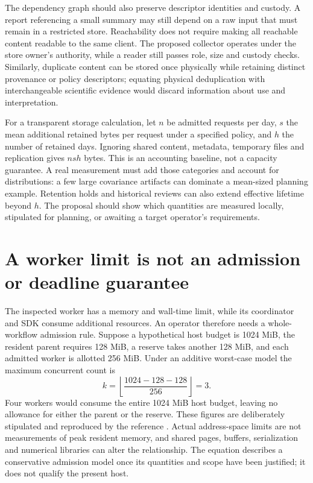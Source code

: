 The dependency graph should also preserve descriptor identities and custody.
A report referencing a small summary may still depend on a raw input that
must remain in a restricted store. Reachability does not require making all
reachable content readable to the same client. The proposed collector
operates under the store owner's authority, while a reader still passes
role, size and custody checks. Similarly, duplicate content can be stored
once physically while retaining distinct provenance or policy descriptors;
equating physical deduplication with interchangeable scientific evidence
would discard information about use and interpretation.

For a transparent storage calculation, let $n$ be admitted requests per day,
$s$ the mean additional retained bytes per request under a specified policy,
and $h$ the number of retained days. Ignoring shared content, metadata,
temporary files and replication gives $nsh$ bytes. This is an accounting
baseline, not a capacity guarantee. A real measurement must add those
categories and account for distributions: a few large covariance artifacts
can dominate a mean-sized planning example. Retention holds and historical
reviews can also extend effective lifetime beyond $h$. The proposal should
show which quantities are measured locally, stipulated for planning, or
awaiting a target operator's requirements.

\section{A worker limit is not an admission or deadline guarantee}
\label{exec17:i4-capacity}

The inspected worker has a memory and wall-time limit, while its coordinator
and SDK consume additional resources. An operator therefore needs a
whole-workflow admission rule. Suppose a hypothetical host budget is
1024 MiB, the resident parent requires 128 MiB, a reserve takes another
128 MiB, and each admitted worker is allotted 256 MiB. Under an additive
worst-case model the maximum concurrent count is
\begin{equation}
 k=\left\lfloor\frac{1024-128-128}{256}\right\rfloor=3.
 \label{exec17:i4-memory}
\end{equation}
Four workers would consume the entire 1024 MiB host budget, leaving no allowance for either the parent or the reserve. These
figures are deliberately stipulated and reproduced by the reference
\citep{exec17_integration_review_reference}. Actual address-space limits are
not measurements of peak resident memory, and shared pages, buffers,
serialization and numerical libraries can alter the relationship. The
equation describes a conservative admission model once its quantities and
scope have been justified; it does not qualify the present host.

